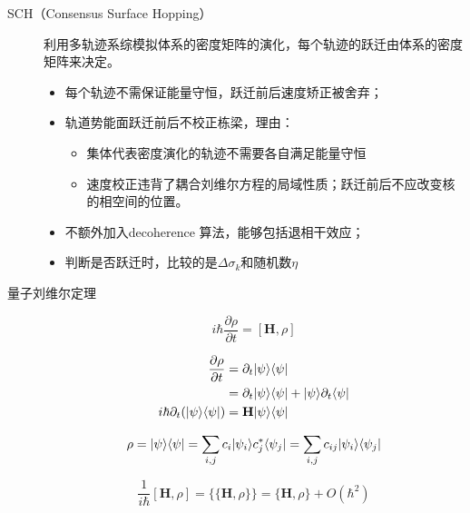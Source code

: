 \begin{description}
	\item[SCH（Consensus Surface Hopping）] 利用多轨迹系综模拟体系的密度矩阵的演化，每个轨迹的跃迁由体系的密度矩阵来决定。
	\begin{itemize}
	\item 每个轨迹不需保证能量守恒，跃迁前后速度矫正被舍弃；
	\item 轨道势能面跃迁前后不校正栋梁，理由：
	\begin{itemize}
		\item 集体代表密度演化的轨迹不需要各自满足能量守恒
		\item 速度校正违背了耦合刘维尔方程的局域性质；跃迁前后不应改变核的相空间的位置。
	\end{itemize}
	\item 不额外加入decoherence 算法，能够包括退相干效应；
	\item 判断是否跃迁时，比较的是$\Delta \sigma_k$和随机数$\eta$
	\end{itemize}

	
	\item[量子刘维尔定理] 
	\begin{equation}
	i\hbar \frac{\partial \rho}{\partial t} = [\textbf{H},\rho]
	\end{equation}

	\begin{align*}
	\frac{\partial \rho}{\partial t}&=\partial_t | \psi \rangle\langle \psi |\\
	&= \partial_t | \psi \rangle \langle \psi | + | \psi \rangle\partial_t\langle \psi |\\
	i\hbar\partial_t(| \psi \rangle\langle \psi |) &= \textbf{H}| \psi \rangle\langle \psi |\\
	\end{align*}

	\begin{equation}
	\rho=| \psi \rangle\langle \psi |=\sum_{i,j}c_i| \psi_i \rangle c_j^*\langle \psi_j |=\sum_{i,j}c_{ij}| \psi_i \rangle\langle \psi_j |
	\end{equation}

	\begin{equation}
	\frac{1}{i\hbar}[\textbf{H},\rho]=\{\{\textbf{H},\rho\}\}=\{\textbf{H},\rho\}+O(\hbar^2)
	\end{equation}


\end{description}
